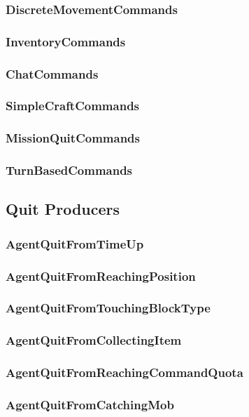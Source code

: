 \documentclass[11pt]{article} %
\begin{document}
\subsubsection{DiscreteMovementCommands}
\subsubsection{InventoryCommands}
\subsubsection{ChatCommands}
\subsubsection{SimpleCraftCommands}
\subsubsection{MissionQuitCommands}
\subsubsection{TurnBasedCommands}

\subsection{Quit Producers}

\subsubsection{AgentQuitFromTimeUp}
\subsubsection{AgentQuitFromReachingPosition}
\subsubsection{AgentQuitFromTouchingBlockType}
\subsubsection{AgentQuitFromCollectingItem}
\subsubsection{AgentQuitFromReachingCommandQuota}
\subsubsection{AgentQuitFromCatchingMob}
\end{document}
